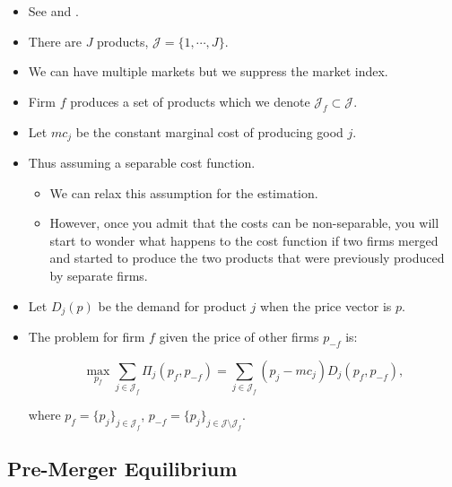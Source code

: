 \documentclass[]{book}
\providecommand{\tightlist}{%
  \setlength{\itemsep}{0pt}\setlength{\parskip}{0pt}}
\begin{document}
\begin{itemize}
\tightlist
\item
  See \citet{Nevo2000c} and \citet{Nevo2001}.
\item
  There are \(J\) products, \(\mathcal{J} = \{1, \cdots, J\}\).
\item
  We can have multiple markets but we suppress the market index.
\item
  Firm \(f\) produces a set of products which we denote
  \(\mathcal{J}_f \subset \mathcal{J}\).
\item
  Let \(mc_j\) be the constant marginal cost of producing good \(j\).
\item
  Thus assuming a separable cost function.

  \begin{itemize}
  \tightlist
  \item
    We can relax this assumption for the estimation.
  \item
    However, once you admit that the costs can be non-separable, you
    will start to wonder what happens to the cost function if two firms
    merged and started to produce the two products that were previously
    produced by separate firms.
  \end{itemize}
\item
  Let \(D_j(p)\) be the demand for product \(j\) when the price vector
  is \(p\).
\item
  The problem for firm \(f\) given the price of other firms \(p_{-f}\)
  is:

  \begin{equation}
  \max_{p_f} \sum_{j \in \mathcal{J}_f} \Pi_j(p_f, p_{-f}) = \sum_{j \in \mathcal{J}_f} (p_j - mc_j) D_j(p_f, p_{-f}),
  \end{equation}

  where \(p_f = \{p_j\}_{j \in \mathcal{J}_f}\),
  \(p_{-f} = \{p_j\}_{j \in \mathcal{J} \setminus \mathcal{J}_f}\).
\end{itemize}

\subsection{Pre-Merger Equilibrium}\label{pre-merger-equilibrium}
\end{document}
